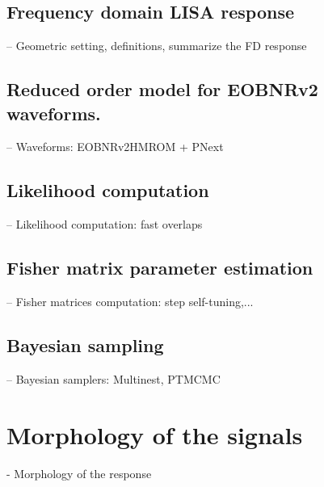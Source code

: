 \documentclass[aps,showpacs,twocolumn,prd,superscriptaddress,nofootinbib]{revtex4}
\begin{document}

\subsection{Frequency domain LISA response}
\label{sec:response}

-- Geometric setting, definitions, summarize the FD response


\subsection{Reduced order model for EOBNRv2 waveforms.}
\label{sec:waveforms}

-- Waveforms: EOBNRv2HMROM + PNext


\subsection{Likelihood computation}
\label{sec:likelihood}

-- Likelihood computation: fast overlaps


\subsection{Fisher matrix parameter estimation}
\label{sec:Fisher}

-- Fisher matrices computation: step self-tuning,...


\subsection{Bayesian sampling}
\label{sec:samplers}

-- Bayesian samplers: Multinest, PTMCMC


\section{Morphology of the signals}
\label{sec:morph}

- Morphology of the response

\end{document}

